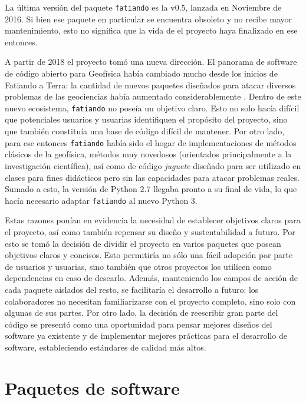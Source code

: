 La última versión del paquete \texttt{fatiando} es la v0.5, lanzada en
Noviembre de 2016.
Si bien ese paquete en particular se encuentra obsoleto y no recibe mayor
mantenimiento, esto no significa que la vida de el proyecto haya finalizado en
ese entonces.

A partir de 2018 el proyecto tomó una nueva dirección.
El panorama de software de código abierto para Geofísica había cambiado mucho
desde los inicios de Fatiando a Terra: la cantidad de nuevos paquetes diseñados
para atacar diversos problemas de las geociencias había aumentado
considerablemente
\citep{cockett2015, ruecker2017, varga2019, obspy2019}.
Dentro de este nuevo ecosistema, \texttt{fatiando} no poseía un objetivo claro.
Esto no solo hacía difícil que potenciales usuarios y usuarias identifiquen el
propósito del proyecto, sino que también constituía una base de código difícil
de mantener.
Por otro lado, para ese entonces \texttt{fatiando} había sido el hogar de
implementaciones de métodos clásicos de la geofísica, métodos muy novedosos
(orientados principalmente a la investigación científica), así como de código
\emph{juguete} diseñado para ser utilizado en clases para fines didácticos
pero sin las capacidades para atacar problemas reales.
Sumado a esto, la versión de Python 2.7 llegaba pronto a su final de vida, lo
que hacía necesario adaptar \texttt{fatiando} al nuevo Python 3.

Estas razones ponían en evidencia la necesidad de establecer objetivos claros
para el proyecto, así como también repensar su diseño y sustentabilidad
a futuro.
Por esto se tomó la decisión de dividir el proyecto en varios paquetes que
posean objetivos claros y concisos.
Esto permitiría no sólo una fácil adopción por parte de usuarios y usuarias,
sino también que otros proyectos los utilicen como dependencias en caso de
desearlo.
Además, manteniendo los campos de acción de cada paquete aislados del resto,
se facilitaría el desarrollo a futuro: los colaboradores no necesitan
familiarizarse con el proyecto completo, sino solo con algunas de sus partes.
Por otro lado, la decisión de reescribir gran parte del código se presentó como
una oportunidad para pensar mejores diseños del software ya existente y de
implementar mejores
prácticas para el desarrollo de software, estableciendo estándares de calidad
más altos.


\section{Paquetes de software}

